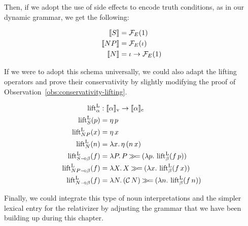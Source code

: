 Then, if we adopt the use of side effects to encode truth conditions, as in
our dynamic grammar, we get the following:

\begin{align*}
  \llbracket S \rrbracket &= \mathcal{F}_E(1) \\
  \llbracket NP \rrbracket &= \mathcal{F}_E(\iota) \\
  \llbracket N \rrbracket &= \iota \to \mathcal{F}_E(1)
\end{align*}

If we were to adopt this schema universally, we could also adapt the
lifting operators and prove their conservativity by slightly modifying the
proof of Observation~\ref{obs:conservativity-lifting}.

\begin{align*}
  \operatorname{lift}^{\mathrm{L}}_\alpha &: \llbracket \alpha \rrbracket_{\mathrm{v}} \to \llbracket \alpha \rrbracket_{\mathrm{c}} \\
  \operatorname{lift}^{\mathrm{L}}_{S}(p) &= \eta\,p \\
  \operatorname{lift}^{\mathrm{L}}_{NP}(x) &= \eta\,x \\
  \operatorname{lift}^{\mathrm{L}}_{N}(n) &= \lambda x.\, \eta\,(n\,x) \\
  \operatorname{lift}^{\mathrm{L}}_{S \mathbin{{-}\mkern-3.5mu{\circ}} \beta}(f) &= \lambda P.\, P \mathbin{\gg\!=} (\lambda p.\, \operatorname{lift}^{\mathrm{L}}_\beta(f\,p)) \\
  \operatorname{lift}^{\mathrm{L}}_{NP \mathbin{{-}\mkern-3.5mu{\circ}} \beta}(f) &= \lambda X.\, X \mathbin{\gg\!=} (\lambda x.\, \operatorname{lift}^{\mathrm{L}}_\beta(f\,x)) \\
  \operatorname{lift}^{\mathrm{L}}_{N \mathbin{{-}\mkern-3.5mu{\circ}} \beta}(f) &= \lambda N.\, (\mathcal{C}\,N) \mathbin{\gg\!=} (\lambda n.\, \operatorname{lift}^{\mathrm{L}}_\beta(f\,n))
\end{align*}

Finally, we could integrate this type of noun interpretations and the
simpler lexical entry for the relativizer by adjusting the grammar that we
have been building up during this chapter.

